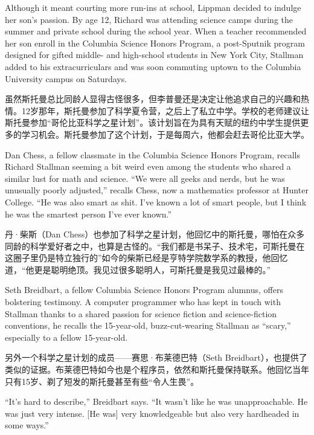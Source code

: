 \ifdefined\eng
Although it meant courting more run-ins at school, Lippman decided to indulge her son's passion. By age 12, Richard was attending science camps during the summer and private school during the school year. When a teacher recommended her son enroll in the Columbia Science Honors Program, a post-Sputnik program designed for gifted middle- and high-school students in New York City, Stallman added to his extracurriculars and was soon commuting uptown to the Columbia University campus on Saturdays.
\fi

\ifdefined\chs
虽然斯托曼总比同龄人显得古怪很多，但李普曼还是决定让他追求自己的兴趣和热情。12岁那年，斯托曼参加了科学夏令营，之后上了私立中学。学校的老师建议让斯托曼参加``哥伦比亚科学之星计划''。该计划旨在为具有天赋的纽约中学生提供更多的学习机会。斯托曼参加了这个计划，于是每周六，他都会赶去哥伦比亚大学。
\fi

\ifdefined\eng
Dan Chess, a fellow classmate in the Columbia Science Honors Program, recalls Richard Stallman seeming a bit weird even among the students who shared a similar lust for math and science. ``We were all geeks and nerds, but he was unusually poorly adjusted,'' recalls Chess, now a mathematics professor at Hunter College. ``He was also smart as shit. I've known a lot of smart people, but I think he was the smartest person I've ever known.''
\fi

\ifdefined\chs
丹·柴斯（Dan Chess）也参加了科学之星计划，他回忆中的斯托曼，哪怕在众多同龄的科学爱好者之中，也算是古怪的。``我们都是书呆子、技术宅，可斯托曼在这圈子里仍是特立独行的''如今的柴斯已经是亨特学院数学系的教授，他回忆道，``他更是聪明绝顶。我见过很多聪明人，可斯托曼是我见过最棒的。''
\fi

\ifdefined\eng
Seth Breidbart, a fellow Columbia Science Honors Program alumnus, offers bolstering testimony. A computer programmer who has kept in touch with Stallman thanks to a shared passion for science fiction and science-fiction conventions, he recalls the 15-year-old, buzz-cut-wearing Stallman as ``scary,'' especially to a fellow 15-year-old.
\fi

\ifdefined\chs
另外一个科学之星计划的成员——赛思·布莱德巴特（Seth Breidbart），也提供了类似的证据。布莱德巴特如今也是个程序员，依然和斯托曼保持联系。他回忆当年只有15岁、剃了短发的斯托曼甚至有些``令人生畏''。
\fi

\ifdefined\eng
``It's hard to describe,'' Breidbart says. ``It wasn't like he was unapproachable. He was just very intense. [He was] very knowledgeable but also very hardheaded in some ways.''
\fi

